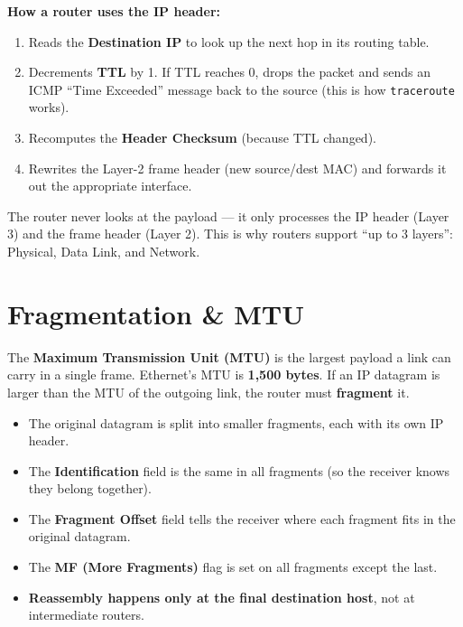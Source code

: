 \documentclass[11pt, letterpaper]{article}
\begin{document}
\begin{tcolorbox}[colback=part5bg, colframe=sectionteal, arc=3pt, boxrule=1pt]
\textbf{How a router uses the IP header:}
\begin{enumerate}[noitemsep, leftmargin=*]
  \item Reads the \textbf{Destination IP} to look up the next hop in its routing table.
  \item Decrements \textbf{TTL} by 1. If TTL reaches 0, drops the packet and sends an ICMP
        ``Time Exceeded'' message back to the source (this is how \texttt{traceroute} works).
  \item Recomputes the \textbf{Header Checksum} (because TTL changed).
  \item Rewrites the Layer-2 frame header (new source/dest MAC) and forwards it out the
        appropriate interface.
\end{enumerate}
The router never looks at the payload --- it only processes the IP header (Layer 3) and
the frame header (Layer 2). This is why routers support ``up to 3 layers'': Physical,
Data Link, and Network.
\end{tcolorbox}

\section*{Fragmentation \& MTU}

The \textbf{Maximum Transmission Unit (MTU)} is the largest payload a link can carry in a
single frame. Ethernet's MTU is \textbf{1,500 bytes}. If an IP datagram is larger than
the MTU of the outgoing link, the router must \textbf{fragment} it.

\begin{itemize}[noitemsep]
  \item The original datagram is split into smaller fragments, each with its own IP header.
  \item The \textbf{Identification} field is the same in all fragments (so the receiver knows
        they belong together).
  \item The \textbf{Fragment Offset} field tells the receiver where each fragment fits in the
        original datagram.
  \item The \textbf{MF (More Fragments)} flag is set on all fragments except the last.
  \item \textbf{Reassembly happens only at the final destination host}, not at intermediate
        routers.
\end{itemize}
\end{document}
